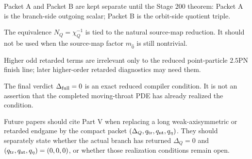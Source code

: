 \begin{verificationchecklist}
\item Packet A and Packet B are kept separate until the Stage 200 theorem: Packet A is the branch-side outgoing scalar; Packet B is the orbit-side quotient triple.
\item The equivalence \(N_Q=\chi_Q^{-1}\) is tied to the natural source-map reduction.  It should not be used when the source-map factor \(m_{\hat0}\) is still nontrivial.
\item Higher odd retarded terms are irrelevant only to the reduced point-particle \(2.5\)PN finish line; later higher-order retarded diagnostics may need them.
\item The final verdict \(\Delta_{\rm full}=0\) is an exact reduced compiler condition.  It is not an assertion that the completed moving-throat PDE has already realized the condition.
\end{verificationchecklist}

Future papers should cite Part V when replacing a long weak-axisymmetric or retarded endgame by the compact packet \((\Delta_Q,q_{\rm tr},q_{\rm nt},q_\eta)\).  They should separately state whether the actual branch has returned \(\Delta_Q=0\) and \((q_{\rm tr},q_{\rm nt},q_\eta)=(0,0,0)\), or whether those realization conditions remain open.
